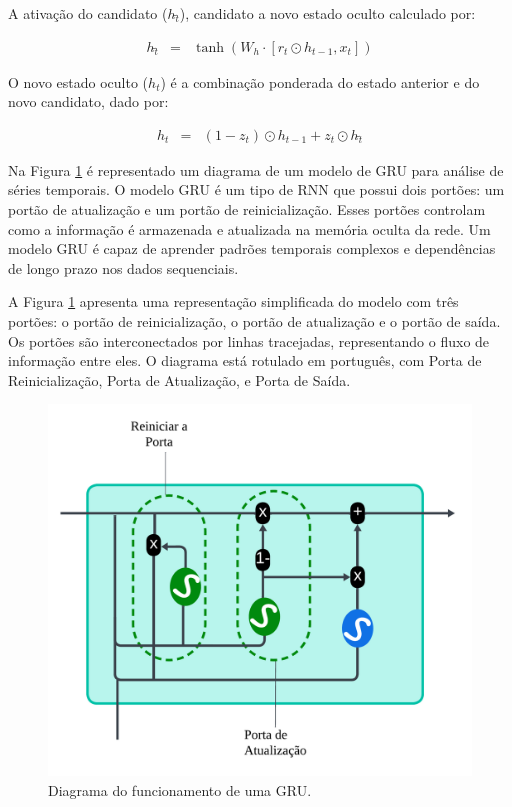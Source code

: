 A ativação do candidato ($h\widetilde{_t}$), candidato a novo estado oculto calculado por:
 	
 	\begin{eqnarray}
 		h\widetilde{_t} &=& \tanh\left(W_h \cdot [r_t \odot h_{t-1}, x_t]\right)\label{eq:gru2}
 	\end{eqnarray}
 	
O novo estado oculto ($h_t$) é a combinação ponderada do estado anterior e do novo candidato, dado por:
 
 	\begin{eqnarray}
 		h_t &=& (1 - z_t) \odot h_{t-1} + z_t \odot h\widetilde{_t}\label{eq:gru3}
 	\end{eqnarray}
 
 Na Figura \ref{fig:gru} é representado um diagrama de um modelo de GRU para análise de séries temporais. O modelo GRU é um tipo de RNN que possui dois portões: um portão de atualização e um portão de reinicialização. Esses portões controlam como a informação é armazenada e atualizada na memória oculta da rede. Um modelo GRU é capaz de aprender padrões temporais complexos e dependências de longo prazo nos dados sequenciais. 
 
 A Figura \ref{fig:gru} apresenta uma representação simplificada do modelo com três portões: o portão de reinicialização, o portão de atualização e o portão de saída. Os portões são interconectados por linhas tracejadas, representando o fluxo de informação entre eles. O diagrama está rotulado em português, com Porta de Reinicialização, Porta de Atualização, e Porta de Saída\cite{Saranya2020, Jordan2021, Khan2022}.
 
 \begin{figure}[!htb]
 \centering
 \caption{Diagrama do funcionamento de uma GRU.}
 \label{fig:gru}
 \includegraphics[width=0.5\linewidth]{Modelos/Figuras/gru.pdf}
\end{figure}
 

